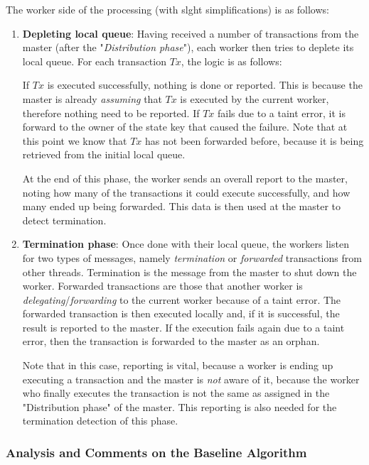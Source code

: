 The worker side of the processing (with slght simplifications) is as follows:

\begin{enumerate}
	\item \textbf{Depleting local queue}: Having received a number of transactions from the master
	(after the "\textit{Distribution phase}"), each worker then tries to deplete its local queue.
	For each transaction $Tx$, the logic is as follows:

	If $Tx$ is executed successfully, nothing is done or reported. This is because the master is
	already \textit{assuming} that $Tx$ is executed by the current worker, therefore nothing need to
	be reported. If $Tx$ fails due to a taint error, it is forward to the owner of the state key
	that caused the failure. Note that at this point we know that $Tx$ has not been forwarded
	before, because it is being retrieved from the initial local queue.

	At the end of this phase, the worker sends an overall report to the master, noting how many
	of the transactions it could execute successfully, and how many ended up being forwarded. This
	data is then used at the master to detect termination.

	\item \textbf{Termination phase}: Once done with their local queue, the workers listen for
	two types of messages, namely \textit{termination} or \textit{forwarded} transactions from other threads.
	Termination is the message from the master to shut down the worker. Forwarded transactions are
	those that another worker is \textit{delegating}/\textit{forwarding} to the current
	worker because of a taint error. The forwarded transaction is then executed locally and, if it is
	successful, the result is reported to the master. If the execution fails again due to a taint
	error, then the transaction is forwarded to the master as an orphan.

	Note that in this case, reporting is vital, because a worker is ending up executing a
	transaction and the master is \textit{not} aware of it, because the worker who finally executes the transaction is not the same as
	assigned in the "Distribution phase" of the master. This reporting is also needed for the termination
	detection of this phase.
\end{enumerate}

\subsubsection{Analysis and Comments on the Baseline Algorithm} \label{chap_approach:subsec:comment_baseline}

